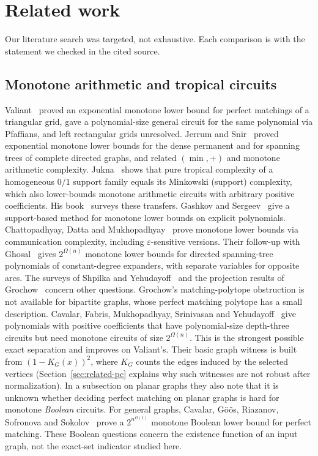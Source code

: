 \section{Related work}\label{sec:related}

Our literature search was targeted, not exhaustive. Each comparison is with the statement we checked in the cited source.

\subsection{Monotone arithmetic and tropical circuits}

Valiant~\cite{Valiant80,Valiant79} proved an exponential monotone lower bound for perfect matchings of a triangular grid, gave a polynomial-size general circuit for the same polynomial via Pfaffians, and left rectangular grids unresolved. Jerrum and Snir~\cite{JerrumSnir82} proved exponential monotone lower bounds for the dense permanent and for spanning trees of complete directed graphs, and related $(\min,+)$ and monotone arithmetic complexity. Jukna~\cite{Jukna16Tropical} shows that pure tropical complexity of a homogeneous $0/1$ support family equals its Minkowski (support) complexity, which also lower-bounds monotone arithmetic circuits with arbitrary positive coefficients. His book~\cite{JuknaTropical23} surveys these transfers. Gashkov and Sergeev~\cite{GashkovSergeev12} give a support-based method for monotone lower bounds on explicit polynomials. Chattopadhyay, Datta and Mukhopadhyay~\cite{ChattopadhyayDattaMukhopadhyay21} prove monotone lower bounds via communication complexity, including $\varepsilon$-sensitive versions. Their follow-up with Ghosal~\cite{CDGM22} gives $2^{\Omega(n)}$ monotone lower bounds for directed spanning-tree polynomials of constant-degree expanders, with separate variables for opposite arcs. The surveys of Shpilka and Yehudayoff~\cite{ShpilkaYehudayoff10} and the projection results of Grochow~\cite{Grochow17} concern other questions. Grochow's matching-polytope obstruction is not available for bipartite graphs, whose perfect matching polytope has a small description. Cavalar, Fabris, Mukhopadhyay, Srinivasan and Yehudayoff~\cite{CavalarFabrisEtAl25} give polynomials with positive coefficients that have polynomial-size depth-three circuits but need monotone circuits of size $2^{\Omega(n)}$. This is the strongest possible exact separation and improves on Valiant's. Their basic graph witness is built from $(1-K_G(x))^2$, where $K_G$ counts the edges induced by the selected vertices (Section~\ref{sec:related-pc} explains why such witnesses are not robust after normalization). In a subsection on planar graphs they also note that it is unknown whether deciding perfect matching on planar graphs is hard for monotone \emph{Boolean} circuits. For general graphs, Cavalar, G\"o\"os, Riazanov, Sofronova and Sokolov~\cite{CavalarGoosEtAl25} prove a $2^{n^{\Omega(1)}}$ monotone Boolean lower bound for perfect matching. These Boolean questions concern the existence function of an input graph, not the exact-set indicator studied here.

